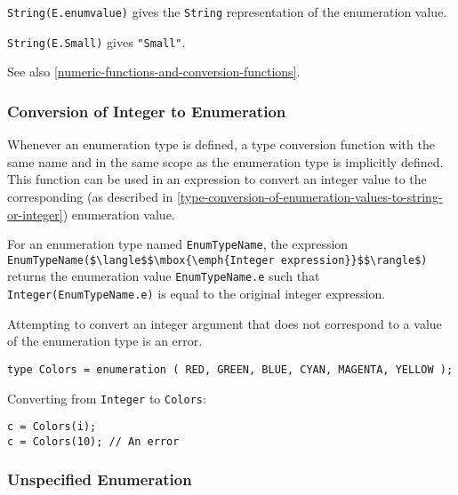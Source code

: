 \lstinline!String(E.enumvalue)! gives the \lstinline!String! representation of the enumeration value.

\begin{example}
\lstinline!String(E.Small)! gives \lstinline!"Small"!.
\end{example}

See also \cref{numeric-functions-and-conversion-functions}.

\subsubsection{Conversion of Integer to Enumeration}\label{conversion-of-integer-to-enumeration}\label{type-conversion-of-integer-to-enumeration-values}

Whenever an enumeration type is defined, a type conversion function with
the same name and in the same scope as the enumeration type is
implicitly defined. This function can be used in an expression to
convert an integer value to the corresponding (as described in \cref{type-conversion-of-enumeration-values-to-string-or-integer}) enumeration value.

For an enumeration type named \lstinline!EnumTypeName!, the expression \lstinline!EnumTypeName($\langle$$\mbox{\emph{Integer expression}}$$\rangle$)! returns the enumeration value \lstinline!EnumTypeName.e! such that \lstinline!Integer(EnumTypeName.e)! is equal to the original integer expression.

Attempting to convert an integer argument that does not correspond to a
value of the enumeration type is an error.

\begin{example}
\begin{lstlisting}[language=modelica]
type Colors = enumeration ( RED, GREEN, BLUE, CYAN, MAGENTA, YELLOW );
\end{lstlisting}

Converting from \lstinline!Integer! to \lstinline!Colors!:
\begin{lstlisting}[language=modelica]
c = Colors(i);
c = Colors(10); // An error
\end{lstlisting}
\end{example}


\subsubsection{Unspecified Enumeration}\label{unspecified-enumeration}

